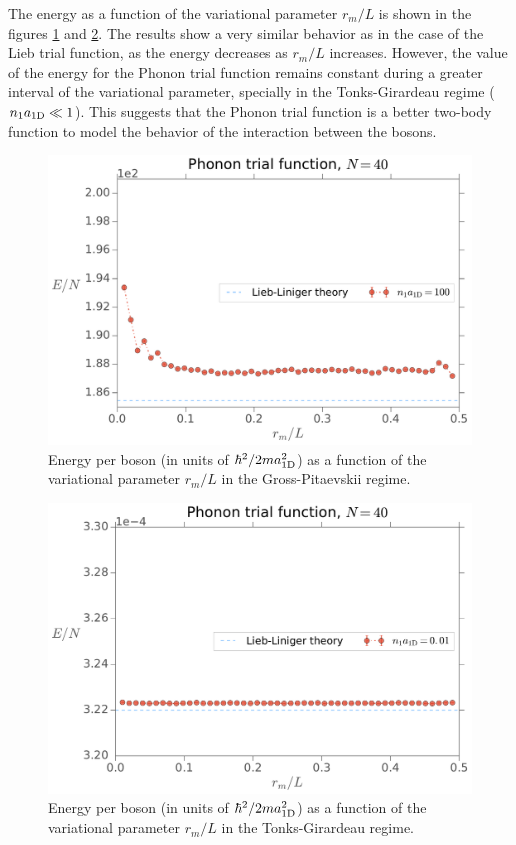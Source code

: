 %
The energy as a function of the variational parameter $r_m / L$ is shown in the
figures \ref{fig:phonon-energy-as-rm-n-a1d-100-nb-40} and
\ref{fig:phonon-energy-as-rm-n-a1d-0-dot-01-nb-40}. The results show a very
similar behavior as in the case of the Lieb trial function, as the energy
decreases as $r_m / L$ increases. However, the value of the energy for the
Phonon trial function remains constant during a greater interval of the
variational parameter, specially in the Tonks-Girardeau regime (${{n}_1}
  a_{ \mathrm{1D} } \ll 1$). This suggests that the Phonon trial function is a better
two-body function to model the behavior of the interaction between the bosons.
%
\begin{figure}[h!]
  \centering
  \includegraphics[width=0.75\linewidth]{./figures/phonon_energy-as-rm_n-a1d-100_Nb-40}
  \caption{ Energy per boson (in units of $\hbar^2/2ma_{ \mathrm{1D} }^2$) as a function
    of the variational parameter $r_m / L$ in the Gross-Pitaevskii regime. }
  \label{fig:phonon-energy-as-rm-n-a1d-100-nb-40}
\end{figure}
%
\begin{figure}[h!]

  \centering
  \includegraphics[width=0.75\linewidth]{./figures/phonon_energy-as-rm_n-a1d-0-dot-01_Nb-40}
  \caption{ Energy per boson (in units of $\hbar^2/2ma_{ \mathrm{1D} }^2$) as a function
    of the variational parameter $r_m / L$ in the Tonks-Girardeau regime. }
  \label{fig:phonon-energy-as-rm-n-a1d-0-dot-01-nb-40}
\end{figure}
